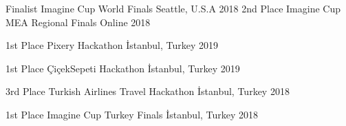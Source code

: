 
\vspace*{-1.5mm}

\vspace*{-1.5mm}

\begin{cvhonors}
  \cvhonor
    {Finalist}%
    {Imagine Cup World Finals}%
    {Seattle, U.S.A}%
    {2018}%
  \cvhonor
    {2nd Place}
    {Imagine Cup MEA Regional Finals} %
    {Online}
    {2018}
\end{cvhonors}


\vspace*{-1.5mm}

\begin{cvhonors}
  \cvhonor
    {1st Place}
    {Pixery Hackathon}
    {İstanbul, Turkey}
    {2019}

  \cvhonor
    {1st Place}
    {ÇiçekSepeti Hackathon}
    {İstanbul, Turkey}
    {2019}

  \cvhonor
    {3rd Place}
    {Turkish Airlines Travel Hackathon}
    {İstanbul, Turkey}
    {2018}

   \cvhonor
    {1st Place}
    {Imagine Cup Turkey Finals}
    {İstanbul, Turkey}
    {2018}

\end{cvhonors}
